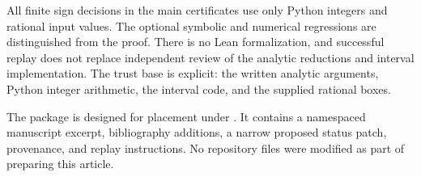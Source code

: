 \documentclass[11pt,a4paper]{article}
\theoremstyle{definition}\newtheorem{definition}[theorem]{Definition}
\theoremstyle{remark}\newtheorem{remark}[theorem]{Remark}
\numberwithin{equation}{section}
\begin{document}
All finite sign decisions in the main certificates use only Python
integers and rational input values. The optional symbolic and numerical
regressions are distinguished from the proof. There is no Lean
formalization, and successful replay does not replace independent review
of the analytic reductions and interval implementation. The trust base
is explicit: the written analytic arguments, Python integer arithmetic,
the interval code, and the supplied rational boxes.

The package is designed for placement under
.
It contains a namespaced manuscript excerpt, bibliography additions,
a narrow proposed status patch, provenance, and replay instructions.
No repository files were modified as part of preparing this article.
\end{document}
